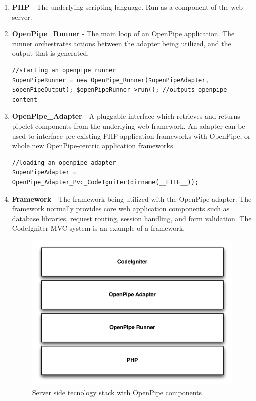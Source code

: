 \documentclass[12pt]{report}
\begin{document}
\begin{enumerate}
	\item \textbf{PHP} - The underlying scripting language. Run as a component of the web server.
	\item \textbf{OpenPipe\_Runner} - The main loop of an OpenPipe application. The runner orchestrates actions between the adapter being utilized, and the output that is generated.
		\begin{lstlisting}
//starting an openpipe runner
$openPipeRunner = new OpenPipe_Runner($openPipeAdapter, $openPipeOutput); $openPipeRunner->run(); //outputs openpipe content
		\end{lstlisting}

	\item \textbf{OpenPipe\_Adapter} - A pluggable interface which retrieves and returns pipelet components from the underlying web framework. An adapter can be used to interface pre-existing PHP application frameworks with OpenPipe, or whole new OpenPipe-centric application frameworks.
		\begin{lstlisting}
//loading an openpipe adapter
$openPipeAdapter = OpenPipe_Adapter_Pvc_CodeIgniter(dirname(__FILE__));
		\end{lstlisting}	

	\item \textbf{Framework} - The framework being utilized with the OpenPipe adapter. The framework normally provides core web application components such as database libraries, request routing, session handling, and form validation. The CodeIgniter MVC system is an example of a framework.
	
		\begin{figure}[H]
		\centering
		\includegraphics[width=\textwidth,keepaspectratio]{figures/images/framework_stack.pdf}
		\caption{Server side tecnology stack with OpenPipe components}
		\label{fig:frameworkStack}
		\end{figure}

\end{enumerate}
\end{document}
